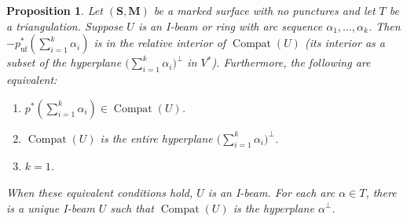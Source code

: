 \documentclass{amsart}
\newtheorem{prop}[proposition]{Proposition}
\theoremstyle{definition}
\theoremstyle{remark}
\numberwithin{equation}{section}
\newcommand{\uf}{{\operatorname{uf}}}
\newcommand{\0}{{\mathbf{0}}}
\newcommand{\M}{\mathbf{M}}
\renewcommand{\S}{\mathbf{S}}
\newcommand{\Compat}{\operatorname{Compat}}
\begin{document}
\begin{prop}\label{basic wall}
Let $(\S,\M)$ be a marked surface \emph{with no punctures} and let $T$ be a triangulation.
Suppose $U$ is an I-beam or ring with arc sequence $\alpha_1,\ldots,\alpha_k$.
Then $-p^*_\uf(\sum_{i=1}^k\alpha_i)$ is in the relative interior of $\Compat(U)$ (its interior as a subset of the hyperplane $\bigl(\sum_{i=1}^k\alpha_i\bigr)^\perp$ in $V^*$).
Furthermore, the following are equivalent:
\begin{enumerate}[\quad\rm(i)]
\item \label{incoming}
$p^*(\sum_{i=1}^k\alpha_i)\in\Compat(U)$.
\item \label{compatU hyp}
$\Compat(U)$ is the entire hyperplane $\bigl(\sum_{i=1}^k\alpha_i\bigr)^\perp$.
\item \label{seq is a1}
$k=1$.
\end{enumerate}
When these equivalent conditions hold, $U$ is an I-beam.
For each arc $\alpha\in T$, there is a unique I-beam $U$ such that $\Compat(U)$ is the hyperplane $\alpha^\perp$.
\end{prop}
\end{document}
